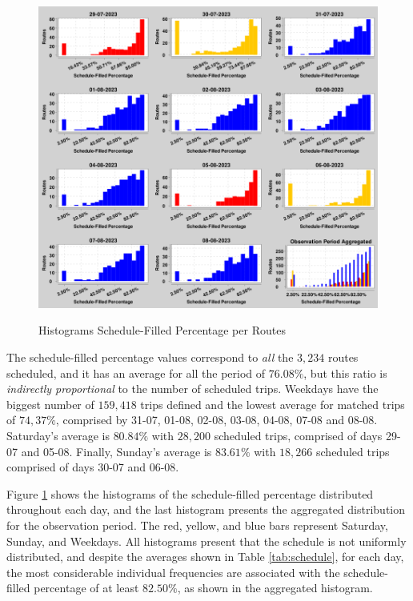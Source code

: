 \begin{figure}[h!]
     \centering
        \caption{Histograms Schedule-Filled Percentage per Routes}
        \includegraphics[width=\textwidth]{imagem/cap5/histogram_schedule-Filled.png}
        \label{img:5:hist}
\end{figure}

The schedule-filled percentage values correspond to {\em all} the $3,234$ routes scheduled, and it has an average for all the period of
$76.08\%$, but this ratio is{ \em indirectly proportional} to the number of scheduled trips. 
Weekdays have the biggest number of $159,418$ trips defined and the lowest average for matched trips of
$74,37\%$, comprised by 31-07, 01-08, 02-08, 03-08, 04-08, 07-08 and 08-08.
Saturday's average is $80.84\%$ with $28,200$ scheduled trips, comprised of days 29-07 and 05-08.
Finally, Sunday's average is $83.61\%$ with $18,266$ scheduled trips comprised of days 30-07 and 06-08.

Figure \ref{img:5:hist} shows the histograms of the schedule-filled percentage distributed throughout each day, and
the last histogram presents the aggregated distribution for the observation period. The red, yellow, and blue bars represent Saturday, Sunday, and Weekdays. All histograms present that the schedule is not uniformly distributed,
and despite the averages shown in Table \ref{tab:schedule}, for each day, the most considerable individual 
frequencies are associated with the schedule-filled percentage of at least $82.50\%$, as shown in the aggregated histogram. 

